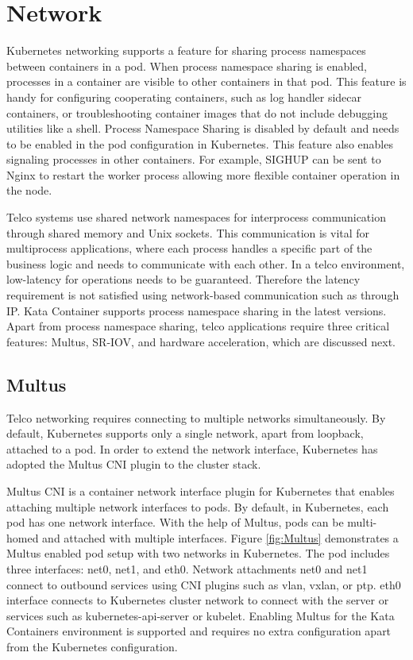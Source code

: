 \section{Network}

Kubernetes networking supports a feature for sharing process namespaces between containers in a pod. When process namespace sharing is enabled, processes in a container are visible to other containers in that pod. This feature is handy for configuring cooperating containers, such as log handler sidecar containers, or troubleshooting container images that do not include debugging utilities like a shell. Process Namespace Sharing is disabled by default and needs to be enabled in the pod configuration in Kubernetes. This feature also enables signaling processes in other containers. For example, SIGHUP can be sent to Nginx to restart the worker process allowing more flexible container operation in the node. \cite{ShareProcessNamespaceKubernetes}

Telco systems use shared network namespaces for interprocess communication through shared memory and Unix sockets. This communication is vital for multiprocess applications, where each process handles a specific part of the business logic and needs to communicate with each other. In a telco environment, low-latency for operations needs to be guaranteed. Therefore the latency requirement is not satisfied using network-based communication such as through IP. Kata Container supports process namespace sharing in the latest versions. Apart from process namespace sharing, telco applications require three critical features: Multus, SR-IOV, and hardware acceleration, which are discussed next.

\subsection{Multus}

Telco networking requires connecting to multiple networks simultaneously. By default, Kubernetes supports only a single network, apart from loopback, attached to a pod. In order to extend the network interface, Kubernetes has adopted the Multus CNI plugin to the cluster stack.

Multus CNI \cite{Multus} is a container network interface plugin for Kubernetes that enables attaching multiple network interfaces to pods. By default, in Kubernetes, each pod has one network interface. With the help of Multus, pods can be multi-homed and attached with multiple interfaces. Figure \ref{fig:Multus} demonstrates a Multus enabled pod setup with two networks in Kubernetes. The pod includes three interfaces: net0, net1, and eth0. Network attachments net0 and net1 connect to outbound services using CNI plugins such as vlan, vxlan, or ptp. eth0 interface connects to Kubernetes cluster network to connect with the server or services such as kubernetes-api-server or kubelet. Enabling Multus for the Kata Containers environment is supported and requires no extra configuration apart from the Kubernetes configuration. \cite{MultusUbuntu}

